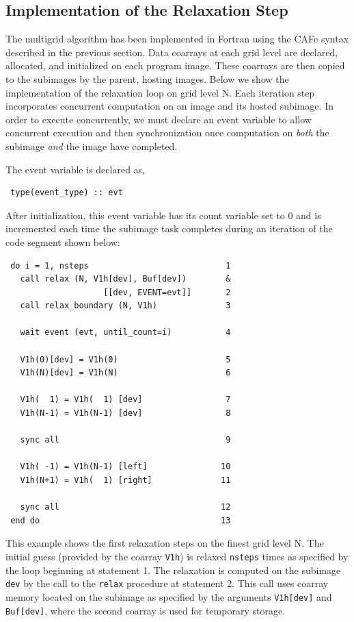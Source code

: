 \subsection{Implementation of the Relaxation Step}

The multigrid algorithm has been implemented in Fortran using the CAFe
syntax described in the previous section. Data coarrays at each grid
level are declared, allocated, and initialized on each program image.
These coarrays are then copied to the subimages by the parent, hosting
images.  Below we show the implementation of the relaxation loop on
grid level N.  Each iteration step incorporates concurrent computation
on an image and its hosted subimage.  In order to execute
concurrently, we must declare an event variable to allow concurrent
execution and then synchronization once computation on \emph{both} 
the subimage \emph{and} the image have completed.

The event variable is declared as,
\begin{verbatim}
 type(event_type) :: evt
\end{verbatim}
After initialization, this event variable has its count variable set to 0 and is incremented
each time the subimage task completes during an iteration of the code segment shown below:
\small
\begin{verbatim}
 do i = 1, nsteps                            1
   call relax (N, V1h[dev], Buf[dev])        &
                    [[dev, EVENT=evt]]       2
   call relax_boundary (N, V1h)              3

   wait event (evt, until_count=i)           4

   V1h(0)[dev] = V1h(0)                      5
   V1h(N)[dev] = V1h(N)                      6

   V1h(  1) = V1h(  1) [dev]                 7
   V1h(N-1) = V1h(N-1) [dev]                 8

   sync all                                  9

   V1h( -1) = V1h(N-1) [left]               10
   V1h(N+1) = V1h(  1) [right]              11

   sync all                                 12
 end do                                     13
\end{verbatim}
\normalsize

This example shows the first relaxation steps on the finest grid level N.  The initial
guess (provided by the coarray \texttt{V1h}) is relaxed \texttt{nsteps} times as
specified by the loop beginning at statement 1.  The relaxation is computed on
the subimage \texttt{dev} by the call to the \texttt{relax} procedure at statement 2.
This call uses coarray memory located on the subimage as specified by the arguments
\texttt{V1h[dev]} and \texttt{Buf[dev]}, where the second coarray is used for temporary
storage.

